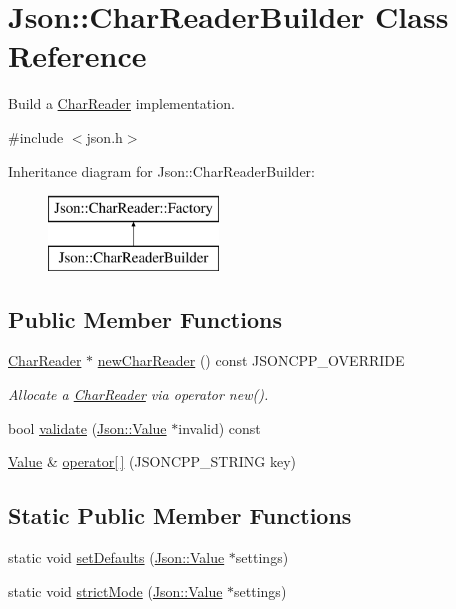 \hypertarget{classJson_1_1CharReaderBuilder}{}\section{Json\+:\+:Char\+Reader\+Builder Class Reference}
\label{classJson_1_1CharReaderBuilder}


Build a \hyperlink{classJson_1_1CharReader}{Char\+Reader} implementation.  




{\ttfamily \#include $<$json.\+h$>$}

Inheritance diagram for Json\+:\+:Char\+Reader\+Builder\+:\begin{figure}[H]
\begin{center}
\leavevmode
\includegraphics[height=2.000000cm]{classJson_1_1CharReaderBuilder}
\end{center}
\end{figure}
\subsection*{Public Member Functions}
\begin{DoxyCompactItemize}
\item 
\hyperlink{classJson_1_1CharReader}{Char\+Reader} $\ast$ \hyperlink{classJson_1_1CharReaderBuilder_a3a262fcc76c1eb8eebfd4718fb4e9722}{new\+Char\+Reader} () const J\+S\+O\+N\+C\+P\+P\+\_\+\+O\+V\+E\+R\+R\+I\+DE
\begin{DoxyCompactList}\small\item\em Allocate a \hyperlink{classJson_1_1CharReader}{Char\+Reader} via operator new(). \end{DoxyCompactList}\item 
bool \hyperlink{classJson_1_1CharReaderBuilder_af890b5cb70e9b372e41de5c9e6535d21}{validate} (\hyperlink{classJson_1_1Value}{Json\+::\+Value} $\ast$invalid) const
\item 
\hyperlink{classJson_1_1Value}{Value} \& \hyperlink{classJson_1_1CharReaderBuilder_a84b35ef443340c06c0aa7b47851d8d86}{operator\mbox{[}$\,$\mbox{]}} (J\+S\+O\+N\+C\+P\+P\+\_\+\+S\+T\+R\+I\+NG key)
\end{DoxyCompactItemize}
\subsection*{Static Public Member Functions}
\begin{DoxyCompactItemize}
\item 
static void \hyperlink{classJson_1_1CharReaderBuilder_a03ff031e06aabff989ab4addc87294ab}{set\+Defaults} (\hyperlink{classJson_1_1Value}{Json\+::\+Value} $\ast$settings)
\item 
static void \hyperlink{classJson_1_1CharReaderBuilder_a9c19e3c5475f9072d527810d4bf56749}{strict\+Mode} (\hyperlink{classJson_1_1Value}{Json\+::\+Value} $\ast$settings)
\end{DoxyCompactItemize}
